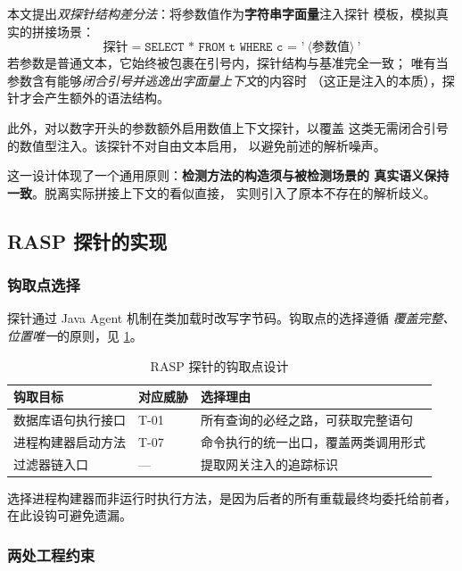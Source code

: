 本文提出\emph{双探针结构差分法}：将参数值作为\textbf{字符串字面量}注入探针
模板，模拟真实的拼接场景：
\begin{equation*}
\text{探针} = \texttt{SELECT * FROM t WHERE c = '}\ \langle \text{参数值} \rangle\ \texttt{'}
\end{equation*}
若参数是普通文本，它始终被包裹在引号内，探针结构与基准完全一致；
唯有当参数含有能够\emph{闭合引号并逃逸出字面量上下文}的内容时
（这正是注入的本质），探针才会产生额外的语法结构。

此外，对以数字开头的参数额外启用数值上下文探针，以覆盖
 这类无需闭合引号的数值型注入。该探针不对自由文本启用，
以避免前述的解析噪声。

\begin{keybox}
这一设计体现了一个通用原则：\textbf{检测方法的构造须与被检测场景的
真实语义保持一致}。脱离实际拼接上下文的看似直接，
实则引入了原本不存在的解析歧义。
\end{keybox}

\subsection{RASP 探针的实现}

\subsubsection{钩取点选择}

探针通过 Java Agent 机制在类加载时改写字节码。钩取点的选择遵循
\emph{覆盖完整、位置唯一}的原则，见 \cref{tab:hook-points}。

\begin{table}[htbp]
\centering
\caption{RASP 探针的钩取点设计}
\label{tab:hook-points}
\small
\begin{tabular}{@{}l l p{5.0cm}@{}}
\toprule
\textbf{钩取目标} & \textbf{对应威胁} & \textbf{选择理由} \\
\midrule
数据库语句执行接口 & T-01 & 所有查询的必经之路，可获取完整语句 \\
进程构建器启动方法 & T-07 & 命令执行的统一出口，覆盖两类调用形式 \\
过滤器链入口       & ---  & 提取网关注入的追踪标识 \\
\bottomrule
\end{tabular}
\end{table}

选择进程构建器而非运行时执行方法，是因为后者的所有重载最终均委托给前者，
在此设钩可避免遗漏。

\subsubsection{两处工程约束}


